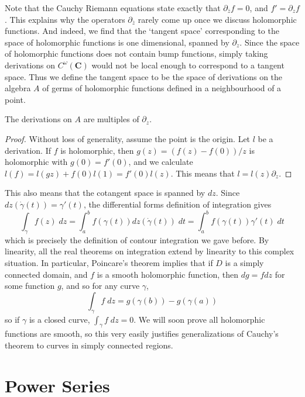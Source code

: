 Note that the Cauchy Riemann equations state exactly that $\partial_{\overline{z}} f = 0$, and $f' = \partial_z f$. This explains why the operators $\partial_{\overline{z}}$ rarely come up once we discuss holomorphic functions. And indeed, we find that the `tangent space' corresponding to the space of holomorphic functions is one dimensional, spanned by $\partial_z$. Since the space of holomorphic functions does not contain bump functions, simply taking derivations on $C^\omega(\mathbf{C})$ would not be local enough to correspond to a tangent space. Thus we define the tangent space to be the space of derivations on the algebra $A$ of germs of holomorphic functions defined in a neighbourhood of a point.

\begin{theorem}
    The derivations on $A$ are multiples of $\partial_z$.
\end{theorem}
\begin{proof}
    Without loss of generality, assume the point is the origin. Let $l$ be a derivation. If $f$ is holomorphic, then $g(z) = (f(z) - f(0))/z$ is holomorphic with $g(0) = f'(0)$, and we calculate $l(f) = l(gz) + f(0)l(1) = f'(0)l(z)$. This means that $l = l(z) \partial_z$.
\end{proof}

This also means that the cotangent space is spanned by $dz$. Since $dz(\dot{\gamma}(t)) = \gamma'(t)$, the differential forms definition of integration gives
%
\[ \int_\gamma f(z)\; dz = \int_a^b f(\gamma(t)) dz \left(\dot{\gamma}(t) \right)\; dt = \int_a^b f(\gamma(t)) \gamma'(t)\; dt \]
%
which is precisely the definition of contour integration we gave before. By linearity, all the real theorems on integration extend by linearity to this complex situation. In particular, Poincare's theorem implies that if $D$ is a simply connected domain, and $f$ is a smooth holomorphic function, then $dg = f dz$ for some function $g$, and so for any curve $\gamma$,
%
\[ \int_\gamma f\; dz = g(\gamma(b)) - g(\gamma(a)) \]
%
so if $\gamma$ is a closed curve, $\int_\gamma f\; dz = 0$. We will soon prove all holomorphic functions are smooth, so this very easily justifies generalizations of Cauchy's theorem to curves in simply connected regions.



\section{Power Series}

